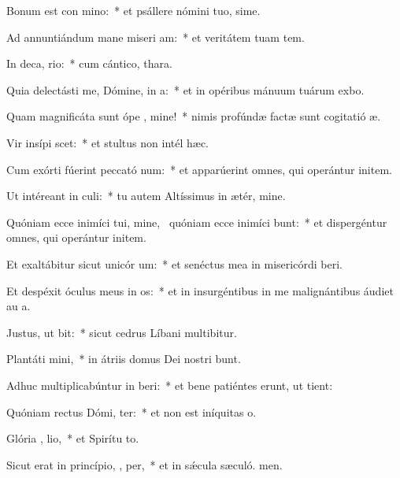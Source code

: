 \item Bonum est con mino:~* et psállere nómini tuo, sime.
\item Ad annuntiándum mane miseri am:~* et veritátem tuam  tem.
\item In deca, rio:~* cum cántico,  thara.
\item Quia delectásti me, Dómine, in  a:~* et in opéribus mánuum tuárum exbo.
\item Quam magnificáta sunt ópe , mine!~* nimis profúndæ factæ sunt cogitatió æ.
\item Vir insípi  scet:~* et stultus non intél hæc.
\item Cum exórti fúerint peccató  num:~* et apparúerint omnes, qui operántur initem.
\item Ut intéreant in  culi:~* tu autem Altíssimus in ætér, mine.
\item Quóniam ecce inimíci tui, mine,~\pscross{} quóniam ecce inimíci  bunt:~* et dispergéntur omnes, qui operántur initem.
\item Et exaltábitur sicut unicór  um:~* et senéctus mea in misericórdi beri.
\item Et despéxit óculus meus in os:~* et in insurgéntibus in me malignántibus áudiet au a.
\item Justus, ut  bit:~* sicut cedrus Líbani multibitur.
\item Plantáti   mini,~* in átriis domus Dei nostri bunt.
\item Adhuc multiplicabúntur in  beri:~* et bene patiéntes erunt, ut tient:
\item Quóniam rectus Dómi,  ter:~* et non est iníquitas  o.
\item Glória ,  lio,~* et Spirítu to.
\item Sicut erat in princípio,  ,  per,~* et in sǽcula sæculó. men.
